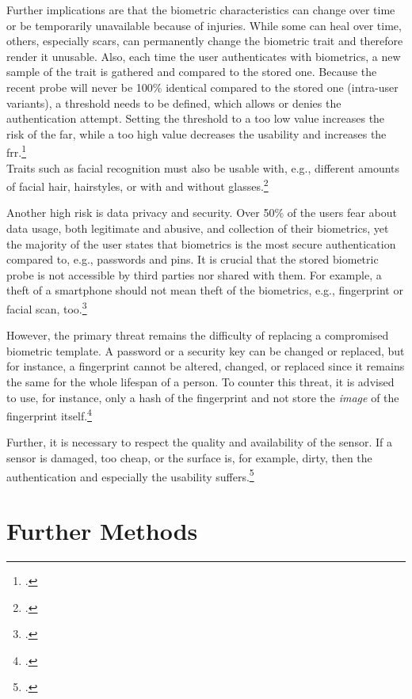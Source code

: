 Further implications are that the biometric characteristics can change over time or be temporarily unavailable because of injuries. While some can heal over time, others, especially scars, can permanently change the biometric trait and therefore render it unusable. Also, each time the user authenticates with biometrics, a new sample of the trait is gathered and compared to the stored one. Because the recent probe will never be 100\% identical compared to the stored one (\frqq intra-user variants\flqq), a threshold needs to be defined, which allows or denies the authentication attempt. Setting the threshold to a too low value increases the risk of the \gls{far}, while a too high value decreases the usability and increases the \gls{frr}.\footcite[See][13--17, 52]{Jain2011}\\Traits such as facial recognition must also be usable with, e.g., different amounts of facial hair, hairstyles, or with and without glasses.\footcite[See][98]{Jain2011}

Another high risk is data privacy and security. Over 50\% of the users fear about data usage, both legitimate and abusive, and collection of their biometrics, yet the majority of the user states that biometrics is the most secure authentication compared to, e.g., passwords and \glspl{pin}. It is crucial that the stored biometric probe is not accessible by third parties nor shared with them. For example, a theft of a smartphone should not mean theft of the biometrics, e.g., fingerprint or facial scan, too.\footcites[See][8]{ibm-security}

However, the primary threat remains the difficulty of replacing a compromised biometric template. A password or a security key can be changed or replaced, but for instance, a fingerprint cannot be altered, changed, or replaced since it remains the same for the whole lifespan of a person. To counter this threat, it is advised to use, for instance, only a hash of the fingerprint and not store the \textit{image} of the fingerprint itself.\footcites[See][266]{shostack2014threat}

Further, it is necessary to respect the quality and availability of the sensor. If a sensor is damaged, too cheap, or the surface is, for example, dirty, then the authentication and especially the usability suffers.\footcites[See][37]{265831}

\section{Further Methods}

